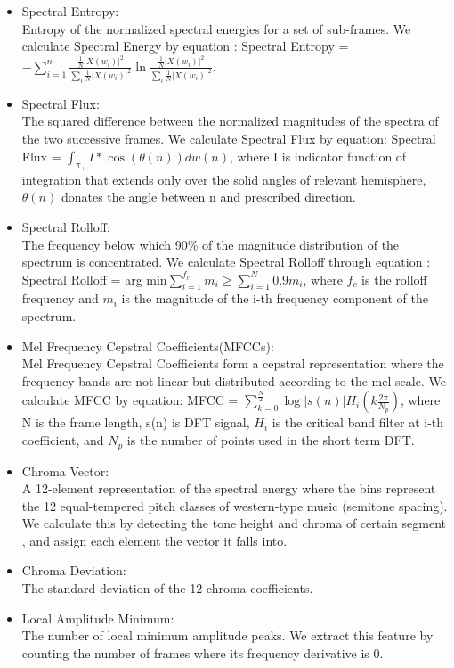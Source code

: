 \begin{itemize}
	\item Spectral Entropy:\\
	Entropy of the normalized spectral energies for a set of sub-frames.\cite{b3} We calculate Spectral Energy by equation : Spectral Entropy = $-\sum_{i = 1}^{n} \frac{\frac{1}{N} |X(w_i)|^2}{\sum_{i}^{}\frac{1}{N} |X(w_i)|^2} \ln\frac{\frac{1}{N} |X(w_i)|^2}{\sum_{i}^{}\frac{1}{N} |X(w_i)|^2}$.\\
	\item Spectral Flux:\\
	The squared difference between the normalized magnitudes of the spectra of the two successive frames.\cite{b3} We calculate Spectral Flux by equation: Spectral Flux = $\int_{\pi_+}^{} I * \cos(\theta(n)) dw(n)$, where I is indicator function of integration that extends only over the solid angles of relevant hemisphere, $\theta(n)$ donates the angle between n and prescribed direction. \\
	\item Spectral Rolloff:\\
	The frequency below which 90\% of the magnitude distribution of the spectrum is concentrated.\cite{b3} We calculate Spectral Rolloff through equation : Spectral Rolloff = arg min$\sum_{i = 1}^{f_c} m_i \geq \sum_{i = 1}^{N}0.9 m_i$, where $f_c$ is the rolloff frequency and $m_i$ is the magnitude of the i-th frequency component of the spectrum. \\
	\item Mel Frequency Cepstral Coefficients(MFCCs):\\
	Mel Frequency Cepstral Coefficients form a cepstral representation where the frequency bands are not linear but distributed according to the mel-scale.\cite{b4} We calculate MFCC by equation: MFCC = $\sum_{k = 0}^{\frac{N}{2}}\log |s(n)| H_i(k\frac{2\pi}{N_p})$, where N is the frame length, s(n) is DFT signal, $H_i$ is the critical band filter at i-th coefficient, and $N_p$ is the number of points used in the short term DFT.\\
	\item Chroma Vector:\\
	A 12-element representation of the spectral energy where the bins represent the 12 equal-tempered pitch classes of western-type music (semitone spacing).\cite{b5} We calculate this by detecting the tone height and chroma of certain segment , and assign each element the vector it falls into.\\
	\item Chroma Deviation:\\
	The standard deviation of the 12 chroma coefficients.\cite{b5}\\
	\item Local Amplitude Minimum:\\
	The number of local minimum amplitude peaks. We extract this feature by counting the number of frames where its frequency derivative is 0.\\
\end{itemize}
